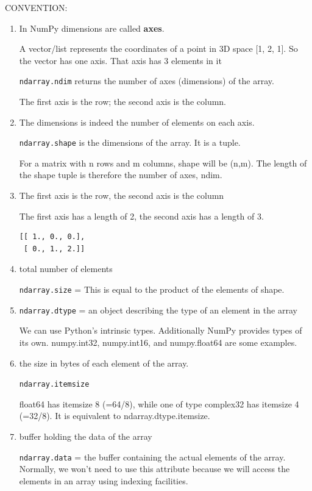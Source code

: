 CONVENTION:
\begin{enumerate}
  \item   In NumPy dimensions are called {\bf axes}.
  
  A vector/list represents the coordinates of a point in 3D space [1, 2, 1].
  So the vector has one axis. That axis has 3 elements in it
 
\verb!ndarray.ndim! returns the number of axes (dimensions) of the array. 
  
  The first axis is the row; the second axis is the column.
  
  \item The dimensions is indeed the number of elements on each axis.
  
\verb!ndarray.shape! is the dimensions of the array.
It is a tuple. 

For a matrix with n rows and m columns, shape will be (n,m). The length of the
shape tuple is therefore the number of axes, ndim.



  \item The first axis is the row, the second axis is the column

The first axis has a length of 2, the second axis has a length of 3.  
\begin{verbatim}
[[ 1., 0., 0.],
 [ 0., 1., 2.]]
\end{verbatim}

  \item total number of elements
 
\verb!ndarray.size! = This is equal to the product of the elements of shape.

  \item \verb!ndarray.dtype! = an object describing the type of an element in the array
  
  We can use Python's intrinsic types. Additionally NumPy provides types of its own. numpy.int32, numpy.int16, and numpy.float64 are some examples.
  
  \item the size in bytes of each element of the array.
  
   \verb!ndarray.itemsize!
  
  float64 has itemsize 8 (=64/8), while one of type complex32 has itemsize 4 (=32/8). It is equivalent to ndarray.dtype.itemsize.
  
  \item buffer holding the data of the array
  
\verb!ndarray.data!  = the buffer containing the actual elements of the array.
Normally, we won’t need to use this attribute because we will access the
elements in an array using indexing facilities.

\end{enumerate} 


